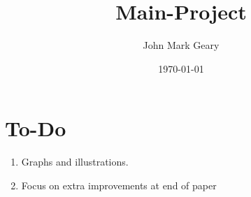 \documentclass[11pt]{article}
\begin{document}
\tableofcontents

\title{Main-Project}
\author{John Mark Geary}
\date{\today}
\maketitle


\section{To-Do}


\begin{enumerate}
\item Graphs and illustrations.
\item Focus on extra improvements at end of paper

\end{enumerate}
\end{document}
